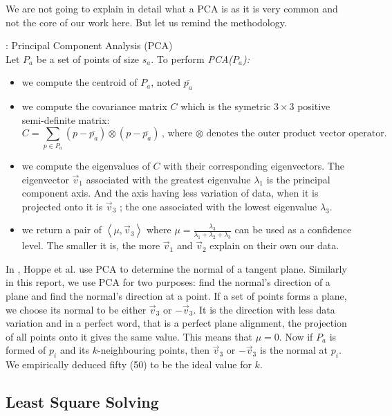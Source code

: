 We are not going to explain in detail what a PCA is as it is very common and not the core of our work here. But let us remind the methodology.

\begin{definition}{: Principal Component Analysis (PCA)}
\\ Let $P_a$ be a set of points of size $s_a$. To perform \textit{PCA($P_a$):}
\begin{itemize}
\item we compute the centroid of $P_a$, noted $\bar{p_a}$
\item we compute the covariance matrix $C$ which is the symetric $3 \times 3$ positive semi-definite matrix:
\begin{equation*}
C = \sum_{p \in P_a} (p - \bar{p_a}) \otimes (p - \bar{p_a}) \text{,       where $\otimes$ denotes the outer product vector operator.}
\end{equation*}
\item we compute the eigenvalues of $C$ with their corresponding eigenvectors. The eigenvector $\vec{v}_1$  associated with the greatest eigenvalue $\lambda_1$  is the principal component axis. And the axis having less variation of data, when it is projected onto it is $\vec{v}_3$ ; the one associated with the lowest eigenvalue $\lambda_3$.
\item we return a pair of $\left\langle \mu, \vec{v}_3 \right\rangle$ where $\mu = \frac{\lambda_3}{\lambda_1 + \lambda_2 + \lambda_3}$ can be used as a confidence level. The smaller it is, the more $\vec{v}_1$ and $\vec{v}_2$  explain on their own our data.
\end{itemize}
\end{definition}

In \cite{hoppe}, Hoppe et al. use PCA to determine the normal of a tangent plane. Similarly in this report, we use PCA for two purposes: find the normal's direction of a plane and find the normal's direction at a point. If a set of points forms a plane, we choose its normal to be either $\vec{v}_3$ or $-\vec{v}_3$. It is the direction with less data variation and in a perfect word, that is a perfect plane alignment, the projection of all points onto it gives the same value. This means that  $\mu = 0$. Now if $P_a$ is formed of $p_i$ and its $k$-neighbouring points, then $\vec{v}_3$ or $-\vec{v}_3$ is the normal at $p_i$. We empirically deduced fifty (50) to be the ideal value for $k$.


\subsection{Least Square Solving}
